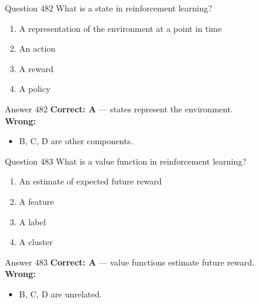 \documentclass[aspectratio=169,11pt]{beamer}
\begin{document}
	\begin{frame}{Question 482}
		What is a state in reinforcement learning?
		\begin{enumerate}[label=\Alph*.]
			\item A representation of the environment at a point in time
			\item An action
			\item A reward
			\item A policy
		\end{enumerate}
	\end{frame}
	\begin{frame}{Answer 482}
		\textbf{Correct: A} --- states represent the environment.\\
		\vspace{0.5em}
		\textbf{Wrong:}
		\begin{itemize}
			\item B, C, D are other components.
		\end{itemize}
	\end{frame}
	
	\begin{frame}{Question 483}
		What is a value function in reinforcement learning?
		\begin{enumerate}[label=\Alph*.]
			\item An estimate of expected future reward
			\item A feature
			\item A label
			\item A cluster
		\end{enumerate}
	\end{frame}
	\begin{frame}{Answer 483}
		\textbf{Correct: A} --- value functions estimate future reward.\\
		\vspace{0.5em}
		\textbf{Wrong:}
		\begin{itemize}
			\item B, C, D are unrelated.
		\end{itemize}
	\end{frame}
	
\end{document}
